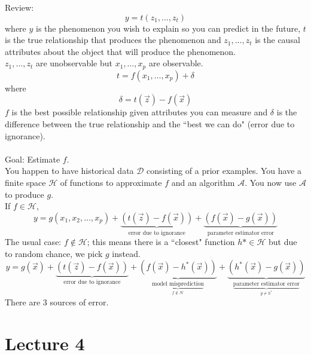 \documentclass[12pt]{article}
\begin{document}
Review: $$y = t(z_1,\dots,z_t)$$ where $y$ is the phenomenon you wish to explain so you can predict in the future, $t$ is the true relationship that produces the phenomenon and $z_1,\dots,z_t$ is the causal attributes about the object that will produce the phenomenon. \\ 
$z_1,\dots, z_t$ are unobservable but $x_1,\dots,x_p$ are observable. 
$$ t = f(x_1,\dots,x_p) + \delta$$ where $$\delta = t(\vec{z}) - f(\vec{x})$$ $f$ is the best possible relationship given attributes you can measure and $\delta$ is the difference between the true relationship and the ``best we can do" (error due to ignorance). \\~\\
Goal: Estimate $f$. \\
You happen to have historical data $\mathcal{D}$ consisting of a prior examples. You have a finite space $\mathcal{H}$ of functions to approximate $f$ and an algorithm $\mathcal{A}$. You now use $\mathcal{A}$ to produce $g$. \\
If $f \in \mathcal{H}$, $$y = g(x_1,x_2,\dots,x_p) + \underbrace{(t(\vec{z}) - f(\vec{x}))}_{\text{error due to ignorance}} + \underbrace{(f(\vec{x}) - g(\vec{x}))}_{\text{parameter estimator error}} $$ 
The usual case: $f \notin \mathcal{H}$; this means there is a ``closest" function $h* \in \mathcal{H}$ but due to random chance, we pick $g$ instead. 
$$y = g(\vec{x}) + \underbrace{(t(\vec{z}) - f(\vec{x}))}_{\text{error due to ignorance}} + \underbrace{(f(\vec{x}) - h^*(\vec{x}))}_{\underbrace{\text{model misprediction}}_{f \notin \mathcal{H}}} + \underbrace{(h^*(\vec{x}) - g(\vec{x}))}_{\underbrace{\text{parameter estimator error}}_{g \neq h^*}} $$ 
There are $3$ sources of error. 

\section{Lecture 4} 
\end{document}
